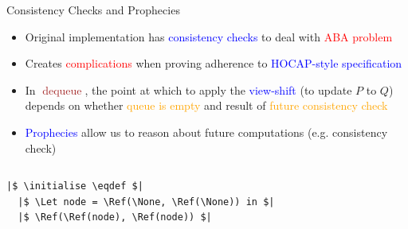 \documentclass[9pt,xcolor={dvipsnames}]{beamer}
\newcommand{\initialise}{\operatorname{initialize}}
\newcommand{\dequeue}{\operatorname{dequeue}}
\begin{document}
\begin{frame}[fragile]{Consistency Checks and Prophecies}
  \begin{itemize}
    \item Original implementation has \textcolor{blue}{consistency checks} to deal with \textcolor{red}{ABA problem}
    \item Creates \textcolor{red}{complications} when proving adherence to \textcolor{blue}{HOCAP-style specification}
    \item In \textcolor{brown}{$\dequeue$}, the point at which to apply the \textcolor{blue}{view-shift} (to update \textcolor{RubineRed}{$P$} to \textcolor{RubineRed}{$Q$}) depends on whether \textcolor{orange}{queue is empty} and result of \textcolor{orange}{future consistency check}
    \item \textcolor{blue}{Prophecies} allow us to reason about future computations (e.g. \textcolor{ExampleColour}{consistency check})
  \end{itemize}
  \vspace{-12pt}
  \begin{columns}[t]
    \begin{column}{0.5\textwidth}
      \begin{verbatim}
|$ \initialise \eqdef $|
  |$ \Let node = \Ref(\None, \Ref(\None)) in $|
  |$ \Ref(\Ref(node), \Ref(node)) $|


\end{verbatim}
\end{column}
\end{columns}
\end{frame}
\end{document}
